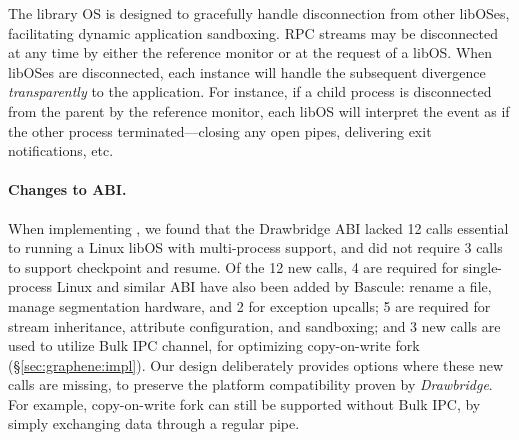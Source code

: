The \sysname{} library OS is designed
to gracefully handle disconnection from other libOSes, 
facilitating dynamic application sandboxing.
RPC streams may be disconnected at any time by 
either the reference monitor or at the request of a libOS.
When \sysname{} libOSes are disconnected, each instance will handle the subsequent
divergence 
{\em transparently} to the application.
For instance, if a child process is disconnected from the parent by the reference monitor,
each libOS will interpret the event as if the other process terminated---closing any open pipes,
delivering exit notifications, etc.



\paragraph{Changes to \pal{} ABI.}
When implementing \sysname{},
we found that the Drawbridge ABI lacked 12 \pal{} calls
essential to running a Linux libOS with multi-process support, and 
\sysname{} did not require 3 \pal{} calls to support checkpoint and resume.
Of the 12 new calls, 4 are required for single-process Linux and similar ABI have also been added by Bascule:
rename a file, manage segmentation hardware, and 2 for exception upcalls;
5 are required for stream inheritance, attribute configuration, and sandboxing;
and 3 new calls are used to utilize Bulk IPC channel, for optimizing copy-on-write fork (\S\ref{sec:graphene:impl}).
Our design deliberately provides options where these new \pal{} calls are missing, to preserve the platform compatibility proven by {\em Drawbridge}. For example, copy-on-write fork can still be supported without Bulk IPC, by simply exchanging data through a regular pipe.

